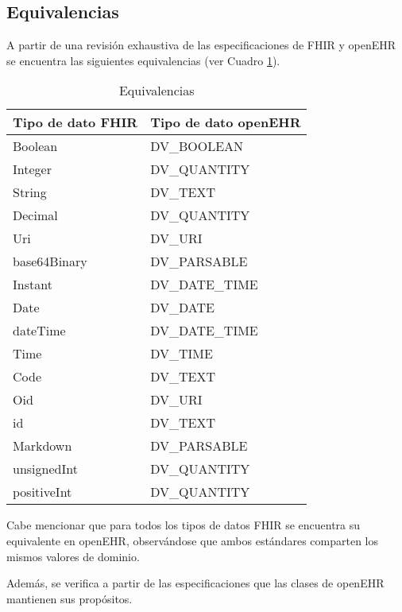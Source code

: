 \subsection{Equivalencias}

A partir de una revisión exhaustiva de las especificaciones de FHIR y openEHR se encuentra las siguientes equivalencias (ver Cuadro \ref{table:equivalents}).

\begin{table}
  \caption{Equivalencias}
  \label{table:equivalents}
  \begin{tabular}{l l}
    \hline
    Tipo de dato FHIR &	Tipo de dato openEHR \\
    \hline
    Boolean	& DV\_BOOLEAN \\
    Integer	& DV\_QUANTITY \\
    String	& DV\_TEXT \\
    Decimal	& DV\_QUANTITY \\
    Uri	& DV\_URI \\
    base64Binary	& DV\_PARSABLE \\
    Instant	& DV\_DATE\_TIME \\
    Date	& DV\_DATE \\
    dateTime	& DV\_DATE\_TIME \\
    Time	& DV\_TIME \\
    Code	& DV\_TEXT \\
    Oid	& DV\_URI \\
    id 	& DV\_TEXT \\
    Markdown	& DV\_PARSABLE \\
    unsignedInt	& DV\_QUANTITY \\
    positiveInt	& DV\_QUANTITY \\
    \hline
  \end{tabular}
\end{table}

Cabe mencionar que para todos los tipos de datos FHIR se encuentra su equivalente en openEHR, observándose que ambos estándares comparten los mismos valores de dominio.

Además, se verifica a partir de las especificaciones que las clases de openEHR mantienen sus propósitos.
